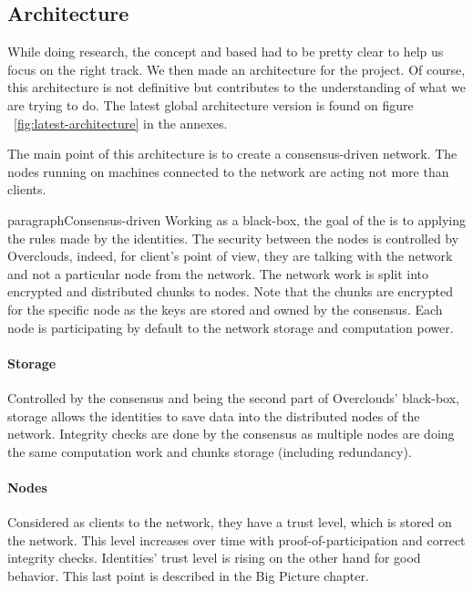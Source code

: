 
\subsection{Architecture}
While doing research, the concept and based had to be pretty clear to help us focus on the right track. We then made an architecture for the project. Of course, this architecture is not definitive but contributes to the understanding of what we are trying to do. The latest global architecture version is found on figure ~\ref{fig:latest-architecture} in the annexes.

The main point of this architecture is to create a consensus-driven network. The nodes running on machines connected to the network are acting not more than clients.

paragraph{Consensus-driven} Working as a black-box, the goal of the is to applying the rules made by the identities. The security between the nodes is controlled by Overclouds, indeed, for client's point of view, they are talking with the network and not a particular node from the network. The network work is split into encrypted and distributed chunks to nodes. Note that the chunks are encrypted for the specific node as the keys are stored and owned by the consensus. Each node is participating by default to the network storage and computation power.

\paragraph{Storage} Controlled by the consensus and being the second part of Overclouds' black-box, storage allows the identities to save data into the distributed nodes of the network. Integrity checks are done by the consensus as multiple nodes are doing the same computation work and chunks storage (including redundancy).

\paragraph{Nodes} Considered as clients to the network, they have a trust level, which is stored on the network. This level increases over time with proof-of-participation and correct integrity checks. Identities' trust level is rising on the other hand for good behavior. This last point is described in the Big Picture chapter.

